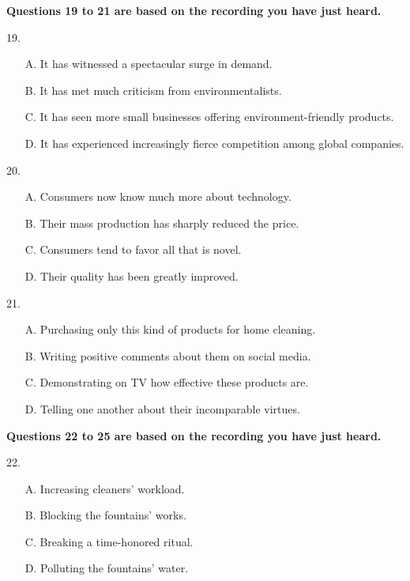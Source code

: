 \documentclass[UTF8,11pt]{ctexart}
\begin{document}
\textbf{Questions 19 to 21 are based on the recording you have just heard.}


19.


\begin{itemize}[leftmargin=2em,itemsep=.2em,topsep=.4em]\item[A.] It has witnessed a spectacular surge in demand.
\item[B.] It has met much criticism from environmentalists.
\item[C.] It has seen more small businesses offering environment-friendly products.
\item[D.] It has experienced increasingly fierce competition among global companies.
\end{itemize}

20.


\begin{itemize}[leftmargin=2em,itemsep=.2em,topsep=.4em]\item[A.] Consumers now know much more about technology.
\item[B.] Their mass production has sharply reduced the price.
\item[C.] Consumers tend to favor all that is novel.
\item[D.] Their quality has been greatly improved.
\end{itemize}

21.


\begin{itemize}[leftmargin=2em,itemsep=.2em,topsep=.4em]\item[A.] Purchasing only this kind of products for home cleaning.
\item[B.] Writing positive comments about them on social media.
\item[C.] Demonstrating on TV how effective these products are.
\item[D.] Telling one another about their incomparable virtues.
\end{itemize}

\textbf{Questions 22 to 25 are based on the recording you have just heard.}


22.


\begin{itemize}[leftmargin=2em,itemsep=.2em,topsep=.4em]\item[A.] Increasing cleaners’ workload.
\item[B.] Blocking the fountains’ works.
\item[C.] Breaking a time-honored ritual.
\item[D.] Polluting the fountains’ water.
\end{itemize}
\end{document}
